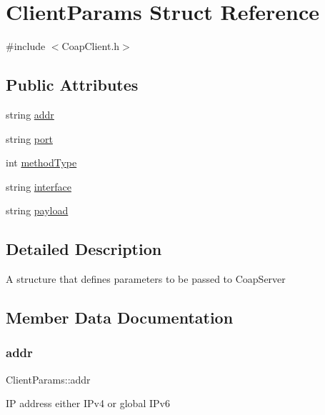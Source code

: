 \hypertarget{structClientParams}{}\section{Client\+Params Struct Reference}
\label{structClientParams}


{\ttfamily \#include $<$Coap\+Client.\+h$>$}

\subsection*{Public Attributes}
\begin{DoxyCompactItemize}
\item 
string \hyperlink{structClientParams_a15c02b4f805bdbc73474b14179e8d370}{addr}
\item 
string \hyperlink{structClientParams_aa71e8951100ec8ea3cfa3e7be5e6ae22}{port}
\item 
int \hyperlink{structClientParams_ac6202bfc3778f0ea08c40e29ca1bc891}{method\+Type}
\item 
string \hyperlink{structClientParams_a1cc5eb17475cf861c44e59e15dab8919}{interface}
\item 
string \hyperlink{structClientParams_afda4769c8fe511da0db2bc541023ad47}{payload}
\end{DoxyCompactItemize}


\subsection{Detailed Description}
A structure that defines parameters to be passed to Coap\+Server 

\subsection{Member Data Documentation}
\mbox{\label{structClientParams_a15c02b4f805bdbc73474b14179e8d370}} 
\subsubsection{\texorpdfstring{addr}{addr}}
{\footnotesize\ttfamily Client\+Params\+::addr}

IP address either I\+Pv4 or global I\+Pv6 \mbox{\label{structClientParams_a1cc5eb17475cf861c44e59e15dab8919}} 
